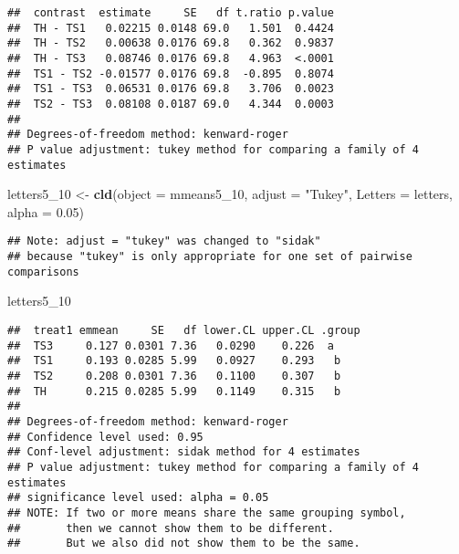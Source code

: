 \documentclass[
]{article}
\newenvironment{Shaded}{\begin{snugshade}}{\end{snugshade}}
\newcommand{\AttributeTok}[1]{\textcolor[rgb]{0.13,0.29,0.53}{#1}}
\newcommand{\FloatTok}[1]{\textcolor[rgb]{0.00,0.00,0.81}{#1}}
\newcommand{\FunctionTok}[1]{\textcolor[rgb]{0.13,0.29,0.53}{\textbf{#1}}}
\newcommand{\NormalTok}[1]{#1}
\newcommand{\OtherTok}[1]{\textcolor[rgb]{0.56,0.35,0.01}{#1}}
\newcommand{\StringTok}[1]{\textcolor[rgb]{0.31,0.60,0.02}{#1}}
\begin{document}
\begin{verbatim}
##  contrast  estimate     SE   df t.ratio p.value
##  TH - TS1   0.02215 0.0148 69.0   1.501  0.4424
##  TH - TS2   0.00638 0.0176 69.8   0.362  0.9837
##  TH - TS3   0.08746 0.0176 69.8   4.963  <.0001
##  TS1 - TS2 -0.01577 0.0176 69.8  -0.895  0.8074
##  TS1 - TS3  0.06531 0.0176 69.8   3.706  0.0023
##  TS2 - TS3  0.08108 0.0187 69.0   4.344  0.0003
## 
## Degrees-of-freedom method: kenward-roger 
## P value adjustment: tukey method for comparing a family of 4 estimates
\end{verbatim}

\begin{Shaded}
\begin{Highlighting}[]
\NormalTok{letters5\_10 }\OtherTok{\textless{}{-}} \FunctionTok{cld}\NormalTok{(}\AttributeTok{object =}\NormalTok{ mmeans5\_10,}
                  \AttributeTok{adjust =} \StringTok{"Tukey"}\NormalTok{,}
                  \AttributeTok{Letters =}\NormalTok{ letters,}
                  \AttributeTok{alpha =} \FloatTok{0.05}\NormalTok{)}
\end{Highlighting}
\end{Shaded}

\begin{verbatim}
## Note: adjust = "tukey" was changed to "sidak"
## because "tukey" is only appropriate for one set of pairwise comparisons
\end{verbatim}

\begin{Shaded}
\begin{Highlighting}[]
\NormalTok{letters5\_10}
\end{Highlighting}
\end{Shaded}

\begin{verbatim}
##  treat1 emmean     SE   df lower.CL upper.CL .group
##  TS3     0.127 0.0301 7.36   0.0290    0.226  a    
##  TS1     0.193 0.0285 5.99   0.0927    0.293   b   
##  TS2     0.208 0.0301 7.36   0.1100    0.307   b   
##  TH      0.215 0.0285 5.99   0.1149    0.315   b   
## 
## Degrees-of-freedom method: kenward-roger 
## Confidence level used: 0.95 
## Conf-level adjustment: sidak method for 4 estimates 
## P value adjustment: tukey method for comparing a family of 4 estimates 
## significance level used: alpha = 0.05 
## NOTE: If two or more means share the same grouping symbol,
##       then we cannot show them to be different.
##       But we also did not show them to be the same.
\end{verbatim}
\end{document}
